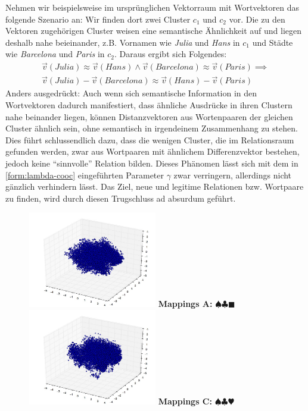 \begin{itemize}
  Nehmen wir beispielsweise im ursprünglichen Vektorraum mit Wortvektoren das folgende Szenario an: Wir finden dort
  zwei Cluster $c_1$ und $c_2$ vor. Die zu den Vektoren zugehörigen Cluster weisen eine semantische Ähnlichkeit auf
  und liegen deshalb nahe beieinander, z.B. Vornamen wie \emph{Julia} und \emph{Hans} in $c_1$ und Städte wie
  \emph{Barcelona} und \emph{Paris} in $c_2$. Daraus ergibt sich Folgendes:
  \begin{equation}
    \begin{split}
      \vec{v}(Julia) \approx \vec{v}(Hans) \land \vec{v}(Barcelona) \approx \vec{v}(Paris) \implies \\
      \vec{v}(Julia) - \vec{v}(Barcelona) \approx \vec{v}(Hans) - \vec{v}(Paris)
    \end{split}
  \end{equation}
  Anders ausgedrückt: Auch wenn sich semantische Information in den Wortvektoren dadurch manifestiert, dass ähnliche
  Ausdrücke in ihren Clustern nahe beinander liegen, können Distanzvektoren aus Wortenpaaren der gleichen Cluster ähnlich sein,
  ohne semantisch in irgendeinem Zusammenhang zu stehen. Dies führt schlussendlich dazu, dass die wenigen Cluster, die
  im Relationsraum gefunden werden, zwar aus Wortpaaren mit ähnlichem Differenzvektor bestehen, jedoch keine ``sinnvolle''
  Relation bilden. Dieses Phänomen lässt sich mit dem in \ref{form:lambda-cooc} eingeführten Parameter $\gamma$ zwar verringern, allerdings nicht gänzlich
  verhindern lässt. Das Ziel, neue und legitime Relationen bzw. Wortpaare zu finden, wird durch diesen Trugschluss ad absurdum geführt.

\begin{figure}[h]
  \centering
  \begin{multicols}{2}
    \includegraphics[width=0.5\textwidth]{../img/mappings_get10000_occ100_cos.jpg}
    \textbf{Mappings A:} $\spadesuit\clubsuit\blacksquare$
    \includegraphics[width=0.5\textwidth]{../img/mappings_get10000_occ100_eucl.jpg}
    \textbf{Mappings C:} $\spadesuit\clubsuit\varheart$


\end{multicols}
\end{figure}
\end{itemize}
